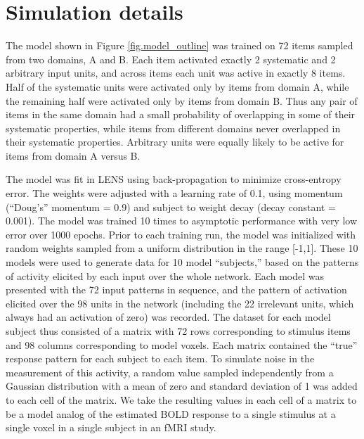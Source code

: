 \section{Simulation details}
The model shown in Figure \ref{fig.model_outline} was trained on 72 items sampled from two domains, A and B. Each item activated exactly 2 systematic and 2 arbitrary input units, and across items each unit was active in exactly 8 items. Half of the systematic units were activated only by items from domain A, while the remaining half were activated only by items from domain B. Thus any pair of items in the same domain had a small probability of overlapping in some of their systematic properties, while items from different domains never overlapped in their systematic properties. Arbitrary units were equally likely to be active for items from domain A versus B.

The model was fit in LENS \cite{rohde_lens:_1999} using back-propagation to minimize cross-entropy error. The weights were adjusted with a learning rate of 0.1, using momentum (``Doug's'' momentum = 0.9) and subject to weight decay (decay constant = 0.001). The model was trained 10 times to asymptotic performance with very low error over 1000 epochs. Prior to each training run, the model was initialized with random weights sampled from a uniform distribution in the range [-1,1]. These 10 models were used to generate data for 10 model ``subjects,'' based on the patterns of activity elicited by each input over the whole network. Each model was presented with the 72 input patterns in sequence, and the pattern of activation elicited over the 98 units in the network (including the 22 irrelevant units, which always had an activation of zero) was recorded. The dataset for each model subject thus consisted of a matrix with 72 rows corresponding to stimulus items and 98 columns corresponding to model voxels. Each matrix contained the ``true'' response pattern for each subject to each item. To simulate noise in the measurement of this activity, a random value sampled independently from a Gaussian distribution with a mean of zero and standard deviation of 1 was added to each cell of the matrix. We take the resulting values in each cell of a matrix to be a model analog of the estimated BOLD response to a single stimulus at a single voxel in a single subject in an fMRI study. 


